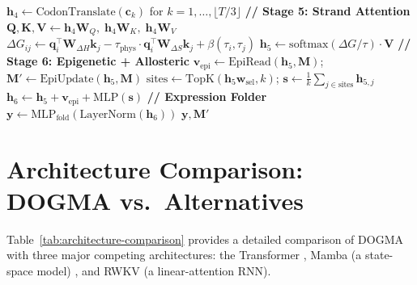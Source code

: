 \begin{algorithm}[H]
\begin{algorithmic}[1]
\State $\mathbf{h}_4 \gets \mathrm{CodonTranslate}(\mathbf{c}_k)$ for $k = 1, \ldots, \lfloor T/3 \rfloor$ 
\Statex
\State \textbf{// Stage 5: Strand Attention}
\State $\mathbf{Q}, \mathbf{K}, \mathbf{V} \gets \mathbf{h}_4 \mathbf{W}_Q,\; \mathbf{h}_4 \mathbf{W}_K,\; \mathbf{h}_4 \mathbf{W}_V$
\State $\Delta G_{ij} \gets \mathbf{q}_i^\top \mathbf{W}_{\Delta H} \mathbf{k}_j - \tau_{\text{phys}} \cdot \mathbf{q}_i^\top \mathbf{W}_{\Delta S} \mathbf{k}_j + \beta(\tau_i, \tau_j)$
\State $\mathbf{h}_5 \gets \mathrm{softmax}(\Delta G / \tau) \cdot \mathbf{V}$ 
\Statex
\State \textbf{// Stage 6: Epigenetic + Allosteric}
\State $\mathbf{v}_{\text{epi}} \gets \mathrm{EpiRead}(\mathbf{h}_5, \mathbf{M})$; \quad $\mathbf{M}' \gets \mathrm{EpiUpdate}(\mathbf{h}_5, \mathbf{M})$ 
\State $\text{sites} \gets \mathrm{TopK}(\mathbf{h}_5 \mathbf{w}_{\text{sel}}, k)$; \quad $\mathbf{s} \gets \frac{1}{k}\sum_{j \in \text{sites}} \mathbf{h}_{5,j}$ 
\State $\mathbf{h}_6 \gets \mathbf{h}_5 + \mathbf{v}_{\text{epi}} + \mathrm{MLP}(\mathbf{s})$
\Statex
\State \textbf{// Expression Folder}
\State $\mathbf{y} \gets \mathrm{MLP}_{\text{fold}}(\mathrm{LayerNorm}(\mathbf{h}_6))$
\State \Return $\mathbf{y}, \mathbf{M}'$
\end{algorithmic}
\end{algorithm}

\section{Architecture Comparison: DOGMA vs.\ Alternatives}
\label{sec:formal-comparison}

Table~\ref{tab:architecture-comparison} provides a detailed comparison of DOGMA with three major competing architectures: the Transformer \citep{vaswani2017}, Mamba (a state-space model) \citep{gu2023mamba}, and RWKV (a linear-attention RNN).

